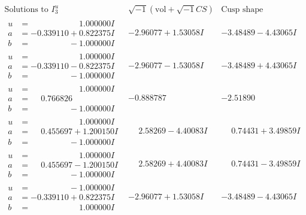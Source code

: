 \documentclass[1p]{elsarticle_modified}
\theoremstyle{definition}
\newcommand{\I}{\sqrt{-1}}
\begin{document}
$$\begin{array}{c|c|c}  
\text{Solutions to }I^u_{3}& \I (\text{vol} + \sqrt{-1}CS) & \text{Cusp shape}\\
 \hline 
\begin{aligned}
u &= \phantom{-0.000000 -}1.000000 I \\
a &= -0.339110 + 0.822375 I \\
b &= \phantom{-0.000000 } -1.000000 I\end{aligned}
 & -2.96077 + 1.53058 I & -3.48489 - 4.43065 I \\ \hline\begin{aligned}
u &= \phantom{-0.000000 -}1.000000 I \\
a &= -0.339110 - 0.822375 I \\
b &= \phantom{-0.000000 } -1.000000 I\end{aligned}
 & -2.96077 - 1.53058 I & -3.48489 + 4.43065 I \\ \hline\begin{aligned}
u &= \phantom{-0.000000 -}1.000000 I \\
a &= \phantom{-}0.766826\phantom{ +0.000000I} \\
b &= \phantom{-0.000000 } -1.000000 I\end{aligned}
 & -0.888787\phantom{ +0.000000I} & -2.51890\phantom{ +0.000000I} \\ \hline\begin{aligned}
u &= \phantom{-0.000000 -}1.000000 I \\
a &= \phantom{-}0.455697 + 1.200150 I \\
b &= \phantom{-0.000000 } -1.000000 I\end{aligned}
 & \phantom{-}2.58269 - 4.40083 I & \phantom{-}0.74431 + 3.49859 I \\ \hline\begin{aligned}
u &= \phantom{-0.000000 -}1.000000 I \\
a &= \phantom{-}0.455697 - 1.200150 I \\
b &= \phantom{-0.000000 } -1.000000 I\end{aligned}
 & \phantom{-}2.58269 + 4.40083 I & \phantom{-}0.74431 - 3.49859 I \\ \hline\begin{aligned}
u &= \phantom{-0.000000 } -1.000000 I \\
a &= -0.339110 + 0.822375 I \\
b &= \phantom{-0.000000 -}1.000000 I\end{aligned}
 & -2.96077 + 1.53058 I & -3.48489 - 4.43065 I \\ \hline\begin{aligned}

\end{aligned}
\end{array}$$
\end{document}
